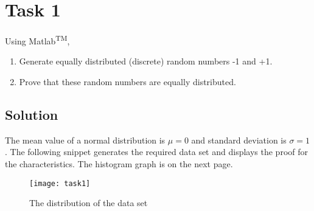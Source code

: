 \section{Task 1}
Using Matlab\textsuperscript{TM},
\begin{enumerate}
    \item Generate equally distributed (discrete) random numbers -1 and +1.
    \item Prove that these random numbers are equally distributed.
\end{enumerate}

\subsection*{Solution}
The mean value of a normal distribution is $\mu=0$ and standard deviation is $\sigma=1$. The following snippet generates the required data set and displays the proof for the characteristics. The histogram graph is on the next page.

\begin{listing}[H]
    
\end{listing}

\begin{figure}[H]
    \centering
    \texttt{[image: task1]}
    \caption{The distribution of the data set}
\end{figure}